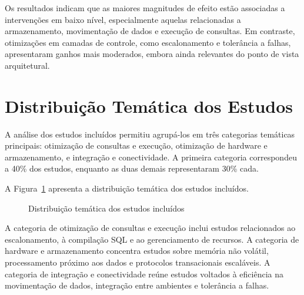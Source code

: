 Os resultados indicam que as maiores magnitudes de efeito estão associadas a intervenções em baixo nível, especialmente aquelas relacionadas a armazenamento, movimentação de dados e execução de consultas. Em contraste, otimizações em camadas de controle, como escalonamento e tolerância a falhas, apresentaram ganhos mais moderados, embora ainda relevantes do ponto de vista arquitetural.

\section{Distribuição Temática dos Estudos}
\label{sec:rsl-distribuicao-tematica}

A análise dos estudos incluídos permitiu agrupá-los em três categorias temáticas principais: otimização de consultas e execução, otimização de hardware e armazenamento, e integração e conectividade. A primeira categoria correspondeu a 40\% dos estudos, enquanto as duas demais representaram 30\% cada.

A Figura~\ref{fig:distribuicao-tematica} apresenta a distribuição temática dos estudos incluídos.

\begin{figure}[htbp]
\centering
{}
\caption{Distribuição temática dos estudos incluídos}
\label{fig:distribuicao-tematica}
\end{figure}

A categoria de otimização de consultas e execução inclui estudos relacionados ao escalonamento, à compilação SQL e ao gerenciamento de recursos. A categoria de hardware e armazenamento concentra estudos sobre memória não volátil, processamento próximo aos dados e protocolos transacionais escaláveis. A categoria de integração e conectividade reúne estudos voltados à eficiência na movimentação de dados, integração entre ambientes e tolerância a falhas.

